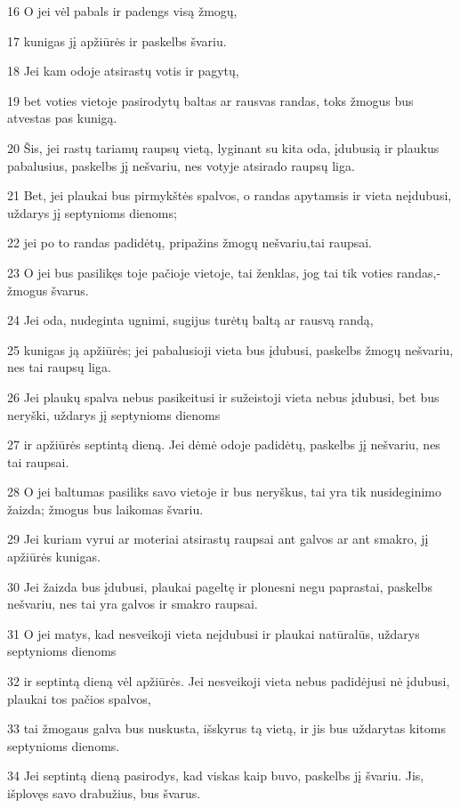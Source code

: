 \par 16 O jei vėl pabals ir padengs visą žmogų, 
\par 17 kunigas jį apžiūrės ir paskelbs švariu. 
\par 18 Jei kam odoje atsirastų votis ir pagytų, 
\par 19 bet voties vietoje pasirodytų baltas ar rausvas randas, toks žmogus bus atvestas pas kunigą. 
\par 20 Šis, jei rastų tariamų raupsų vietą, lyginant su kita oda, įdubusią ir plaukus pabalusius, paskelbs jį nešvariu, nes votyje atsirado raupsų liga. 
\par 21 Bet, jei plaukai bus pirmykštės spalvos, o randas apytamsis ir vieta neįdubusi, uždarys jį septynioms dienoms; 
\par 22 jei po to randas padidėtų, pripažins žmogų nešvariu,­tai raupsai. 
\par 23 O jei bus pasilikęs toje pačioje vietoje, tai ženklas, jog tai tik voties randas,­žmogus švarus. 
\par 24 Jei oda, nudeginta ugnimi, sugijus turėtų baltą ar rausvą randą, 
\par 25 kunigas ją apžiūrės; jei pabalusioji vieta bus įdubusi, paskelbs žmogų nešvariu, nes tai raupsų liga. 
\par 26 Jei plaukų spalva nebus pasikeitusi ir sužeistoji vieta nebus įdubusi, bet bus neryški, uždarys jį septynioms dienoms 
\par 27 ir apžiūrės septintą dieną. Jei dėmė odoje padidėtų, paskelbs jį nešvariu, nes tai raupsai. 
\par 28 O jei baltumas pasiliks savo vietoje ir bus neryškus, tai yra tik nusideginimo žaizda; žmogus bus laikomas švariu. 
\par 29 Jei kuriam vyrui ar moteriai atsirastų raupsai ant galvos ar ant smakro, jį apžiūrės kunigas. 
\par 30 Jei žaizda bus įdubusi, plaukai pageltę ir plonesni negu paprastai, paskelbs nešvariu, nes tai yra galvos ir smakro raupsai. 
\par 31 O jei matys, kad nesveikoji vieta neįdubusi ir plaukai natūralūs, uždarys septynioms dienoms 
\par 32 ir septintą dieną vėl apžiūrės. Jei nesveikoji vieta nebus padidėjusi nė įdubusi, plaukai tos pačios spalvos, 
\par 33 tai žmogaus galva bus nuskusta, išskyrus tą vietą, ir jis bus uždarytas kitoms septynioms dienoms. 
\par 34 Jei septintą dieną pasirodys, kad viskas kaip buvo, paskelbs jį švariu. Jis, išplovęs savo drabužius, bus švarus. 
